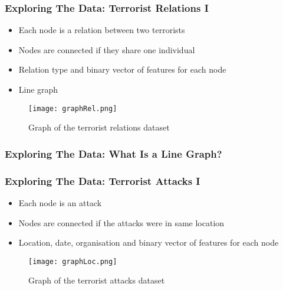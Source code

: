 \begin{frame}
\frametitle{Exploring The Data: Terrorist Relations I}
	
	\begin{itemize}
		\item  Each node is a relation between two terrorists
		\item  Nodes are connected if they share one individual
		\item  Relation type and binary vector of features for each node
		\item  Line graph
	\end{itemize}
	
	\begin{figure}
		\begin{center}
			\texttt{[image: graphRel.png]}
			\caption{Graph of the terrorist relations dataset}
			\label{fig:graph relations}
		\end{center}
	\end{figure}
	
\end{frame}

\begin{frame}
\frametitle{Exploring The Data: What Is a Line Graph?}
%
\end{frame}

\begin{frame}
\frametitle{Exploring The Data: Terrorist Attacks I}
	
	\begin{itemize}
		\item Each node is an attack
		\item Nodes are connected if the attacks were in same location
		\item Location, date, organisation and binary vector of features for each node
	\end{itemize}
	
	\begin{figure}
		\begin{center}
			\texttt{[image: graphLoc.png]}
			\caption{Graph of the terrorist attacks dataset}
			\label{fig:graph relations}
		\end{center}
	\end{figure}
\end{frame}

